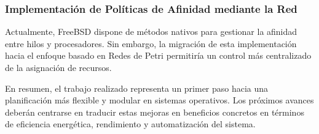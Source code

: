 \subsubsection{Implementación de Políticas de Afinidad mediante la Red}
Actualmente, FreeBSD dispone de métodos nativos para gestionar la afinidad entre hilos y procesadores. Sin embargo, la migración de esta implementación hacia el enfoque basado en Redes de Petri permitiría un control más centralizado de la asignación de recursos.

En resumen, el trabajo realizado representa un primer paso hacia una planificación más flexible y modular en sistemas operativos. Los próximos avances deberán centrarse en traducir estas mejoras en beneficios concretos en términos de eficiencia energética, rendimiento y automatización del sistema.